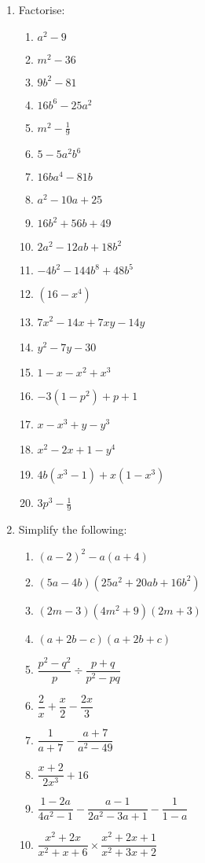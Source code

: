 \begin{eocexercises}{}
\begin{enumerate}[itemsep=5pt, label=\textbf{\arabic*}. ]
\item Factorise:
\begin{multicols}{2}
\begin{enumerate}[itemsep=5pt, label=\textbf{(\alph*)} ] 
\item ${a}^{2}-9$
\item ${m}^{2}-36$
\item $9{b}^{2}-81$
\item $16{b}^{6}-25{a}^{2}$
\item ${m}^{2}-\frac{1}{9}$
\item $5-5{a}^{2}{b}^{6}$
\item $16b{a}^{4}-81b$
\item ${a}^{2}-10a+25$
\item $16{b}^{2}+56b+49$
\item $2{a}^{2}-12ab+18{b}^{2}$
\item $-4{b}^{2}-144{b}^{8}+48{b}^{5}$
\item $(16-{x}^{4})$
\item ${7x}^{2}-14x+7xy-14y$
\item ${y}^{2}-7y-30$
\item $1-x-{x}^{2}+{x}^{3}$
\item $-3(1-{p}^{2})+p+1$
\item $x-x^{3} + y - y^{3}$
\item $x^{2} - 2x + 1 - y^{4}$
\item $4b(x^{3} - 1) + x(1-x^{3})$
\item $3p^{3} - \frac{1}{9}$
\end{enumerate}
\end{multicols}


\item Simplify the following:
\begin{multicols}{2}
\begin{enumerate}[itemsep=5pt, label=\textbf{(\alph*)} ] 

\item ${(a-2)}^{2}-a(a+4)$
\item $(5a-4b)(25{a}^{2}+20ab+16{b}^{2})$
\item $(2m-3)(4{m}^{2}+9)(2m+3)$
\item $(a+2b-c)(a+2b+c)$
\item $\dfrac{{p}^{2}-{q}^{2}}{p}÷\dfrac{p+q}{{p}^{2}-pq}$
\item $\dfrac{2}{x}+\dfrac{x}{2}-\dfrac{2x}{3}$
\item $\dfrac{1}{a+7}-\dfrac{a+7}{a^{2}-49}$
\item $\dfrac{x+2}{2x^{3}} + 16$
\item $\dfrac{1-2a}{4a^{2} -1} - \dfrac{a-1}{2a^{2}-3a+1} - \dfrac{1}{1-a}$
\item $\dfrac{x^{2} + 2x}{x^{2}+ x + 6} \times \dfrac{x^{2} + 2x + 1}{x^{2} + 3x +2}$
\end{enumerate}
\end{multicols}


\end{enumerate}
\end{eocexercises}
